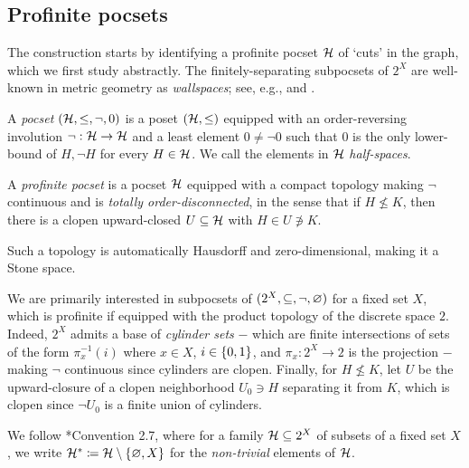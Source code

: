 \documentclass[reqno]{amsart}
\begin{document}
    \subsection{Profinite pocsets}\label{sec:pocsets_of_cuts}

    The construction starts by identifying a profinite pocset $\mc{H}$ of `cuts' in the graph, which we first study abstractly. The finitely-separating subpocsets of $2^X$ are well-known in metric geometry as \textit{wallspaces}; see, e.g., \cite{Nic04} and \cite{CN05}.

    \begin{definition}\label{def:profinite_pocset}
        A \textit{pocset} $(\mc{H},\leq,\lnot,0)$ is a poset $(\mc{H},\leq)$ equipped with an order-reversing involution $\lnot:\mc{H}\to\mc{H}$ and a least element $0\neq\lnot0$ such that $0$ is the only lower-bound of $H,\lnot H$ for every $H\in\mc{H}$. We call the elements in $\mc{H}$ \textit{half-spaces}.

        A \textit{profinite pocset} is a pocset $\mc{H}$ equipped with a compact topology making $\lnot$ continuous and is \textit{totally order-disconnected}, in the sense that if $H\not\leq K$, then there is a clopen upward-closed $U\subseteq\mc{H}$ with $H\in U\not\ni K$.
    \end{definition}

    \begin{remark}
        Such a topology is automatically Hausdorff and zero-dimensional, making it a Stone space.
    \end{remark}

    We are primarily interested in subpocsets of $(2^X,\subseteq,\lnot,\em)$ for a fixed set $X$, which is profinite if equipped with the product topology of the discrete space $2$. Indeed, $2^X$ admits a base of \textit{cylinder sets} $-$ which are finite intersections of sets of the form $\pi^{-1}_x(i)$ where $x\in X$, $i\in\l\{0,1\r\}$, and $\pi_x:2^X\to2$ is the projection $-$ making $\lnot$ continuous since cylinders are clopen. Finally, for $H\not\leq K$,  let $U$ be the upward-closure of a clopen neighborhood $U_0\ni H$ separating it from $K$, which is clopen since $\lnot U_0$ is a finite union of cylinders.

    \begin{remark*}
        We follow \cite{CPTT23}*{Convention 2.7}, where for a family $\mc{H}\subseteq2^X$ of subsets of a fixed set $X$, we write $\mc{H}^\ast\coloneqq\mc{H}\comp\l\{\em,X\r\}$ for the \textit{non-trivial} elements of $\mc{H}$.
    \end{remark*}
\end{document}
